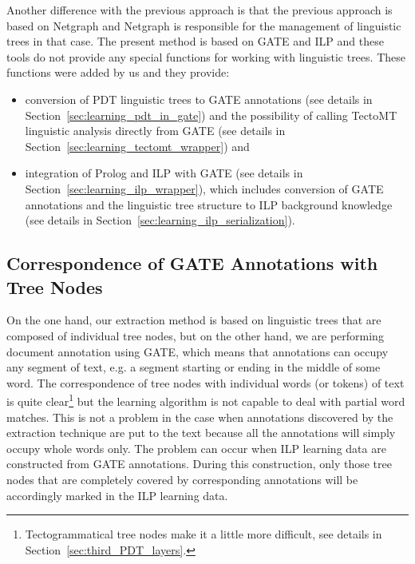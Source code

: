 Another difference with the previous approach is that the previous approach is based on Netgraph and Netgraph is responsible for the management of linguistic trees in that case. The present method is based on GATE and ILP and these tools do not provide any special functions for working with linguistic trees. These functions were added by us and they provide:
\begin{itemize}	
	\item conversion of PDT linguistic trees to GATE annotations (see details in Section~\ref{sec:learning_pdt_in_gate}) and the possibility of calling TectoMT linguistic analysis directly from GATE (see details in Section~\ref{sec:learning_tectomt_wrapper}) and
	
	\item integration of Prolog and ILP with GATE (see details in Section~\ref{sec:learning_ilp_wrapper}), which includes conversion of GATE annotations and the linguistic tree structure to ILP background knowledge (see details in Section~\ref{sec:learning_ilp_serialization}).
\end{itemize}





\subsection{Correspondence of GATE Annotations with Tree Nodes}

On the one hand, our extraction method is based on linguistic trees that are composed of individual tree nodes, but on the other hand, we are performing document annotation using GATE, which means that annotations can occupy any segment of text, e.g. a segment starting or ending in the middle of some word. The correspondence of tree nodes with individual words (or tokens) of text is quite clear\footnote{Tectogrammatical tree nodes make it a little more difficult, see details in Section~\ref{sec:third_PDT_layers}.} but the learning algorithm is not capable to deal with partial word matches. This is not a problem in the case when annotations discovered by the extraction technique are put to the text because all the annotations will simply occupy whole words only. The problem can occur when ILP learning data are constructed from GATE annotations. During this construction, only those tree nodes that are completely covered by corresponding annotations will be accordingly marked in the ILP learning data.

\pagebreak

